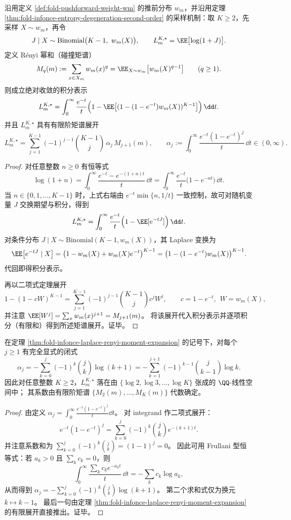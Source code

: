 \begin{theorem}\label{thm:fold-infonce-laplace-renyi-moment-expansion}
沿用定义 \ref{def:fold-pushforward-weight-wm} 的推前分布 \(w_m\)，并沿用定理 \ref{thm:fold-infonce-entropy-degeneration-second-order} 的采样机制：取 \(K\ge 2\)，先采样 \(X\sim w_m\)，再令
\[
J\mid X\sim \mathrm{Binomial}\bigl(K-1,\ w_m(X)\bigr),
\qquad
L_m^{K,\star}=\EE\bigl[\log(1+J)\bigr].
\]
定义 Rényi 幂和（碰撞矩谱）
\[
M_q(m):=\sum_{x\in X_m} w_m(x)^q=\EE_{X\sim w_m}\bigl[w_m(X)^{q-1}\bigr]\qquad(q\ge 1).
\]
则成立绝对收敛的积分表示
\[
L_m^{K,\star}
=
\int_{0}^{\infty}\frac{e^{-t}}{t}
\Bigl(1-\EE\bigl[(1-(1-e^{-t})w_m(X))^{K-1}\bigr]\Bigr)\,\dd t.
\]
并且 \(L_m^{K,\star}\) 具有有限阶矩谱展开
\[
L_m^{K,\star}
=
\sum_{j=1}^{K-1}(-1)^{j-1}\binom{K-1}{j}\,\alpha_j\,M_{j+1}(m),
\qquad
\alpha_j:=\int_{0}^{\infty}\frac{e^{-t}(1-e^{-t})^j}{t}\,\dd t\in(0,\infty).
\]
\end{theorem}
\begin{proof}
对任意整数 \(n\ge 0\) 有恒等式
\[
\log(1+n)=\int_{0}^{\infty}\frac{e^{-t}-e^{-(1+n)t}}{t}\,\dd t
=\int_{0}^{\infty}\frac{e^{-t}}{t}\bigl(1-e^{-nt}\bigr)\,\dd t.
\]
当 \(n\in\{0,1,\dots,K-1\}\) 时，上式右端由
\(
e^{-t}\min\{n,1/t\}
\)
一致控制，故可对随机变量 \(J\) 交换期望与积分，得到
\[
L_m^{K,\star}
=
\int_{0}^{\infty}\frac{e^{-t}}{t}\Bigl(1-\EE[e^{-tJ}]\Bigr)\,\dd t.
\]
对条件分布 \(J\mid X\sim\mathrm{Binomial}(K-1,w_m(X))\)，其 Laplace 变换为
\[
\EE\bigl[e^{-tJ}\mid X\bigr]
=\bigl(1-w_m(X)+w_m(X)e^{-t}\bigr)^{K-1}
=\bigl(1-(1-e^{-t})w_m(X)\bigr)^{K-1}.
\]
代回即得积分表示。
\par
再以二项式定理展开
\[
1-(1-cW)^{K-1}=\sum_{j=1}^{K-1}(-1)^{j-1}\binom{K-1}{j}c^j W^j,
\qquad c=1-e^{-t},\ \ W=w_m(X),
\]
并注意 \(\EE[W^j]=\sum_x w_m(x)^{j+1}=M_{j+1}(m)\)。
将该展开代入积分表示并逐项积分（有限和）得到所述矩谱展开。证毕。
\end{proof}

\begin{corollary}\label{cor:fold-infonce-alpha-log-closed-form}
在定理 \ref{thm:fold-infonce-laplace-renyi-moment-expansion} 的记号下，对每个 \(j\ge 1\) 有完全显式的闭式
\[
\alpha_j
=
-\sum_{k=0}^{j}(-1)^k\binom{j}{k}\log(k+1)
=
-\sum_{k=1}^{j+1}(-1)^{k-1}\binom{j}{k-1}\log k.
\]
因此对任意整数 \(K\ge 2\)，\(L_m^{K,\star}\) 落在由 \(\{\log 2,\log 3,\dots,\log K\}\) 张成的 \(\QQ\)-线性空间中；
其系数由有限阶矩谱 \(\{M_2(m),\dots,M_K(m)\}\) 代数确定。
\end{corollary}
\begin{proof}
由定义
\(
\alpha_j=\int_{0}^{\infty}\frac{e^{-t}(1-e^{-t})^j}{t}\dd t
\)。
对 integrand 作二项式展开：
\[
e^{-t}(1-e^{-t})^j=\sum_{k=0}^{j}(-1)^k\binom{j}{k}e^{-(k+1)t}.
\]
并注意系数和为 \(\sum_{k=0}^{j}(-1)^k\binom{j}{k}=(1-1)^j=0\)。
因此可用 Frullani 型恒等式：若 \(a_k>0\) 且 \(\sum_k c_k=0\)，则
\[
\int_{0}^{\infty}\frac{\sum_k c_k e^{-a_k t}}{t}\,\dd t=-\sum_k c_k\log a_k,
\]
从而得到
\(
\alpha_j=-\sum_{k=0}^{j}(-1)^k\binom{j}{k}\log(k+1)
\)。
第二个求和式仅为换元 \(k\mapsto k-1\)。
最后一句由定理 \ref{thm:fold-infonce-laplace-renyi-moment-expansion} 的有限展开直接推出。证毕。
\end{proof}

